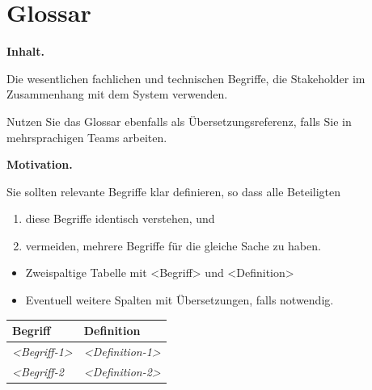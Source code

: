 \documentclass[]{article}
\begin{document}
\section{Glossar}\label{section-glossary}

\textbf{Inhalt.}

Die wesentlichen fachlichen und technischen Begriffe, die Stakeholder im
Zusammenhang mit dem System verwenden.

Nutzen Sie das Glossar ebenfalls als Übersetzungsreferenz, falls Sie in
mehrsprachigen Teams arbeiten.

\textbf{Motivation.}

Sie sollten relevante Begriffe klar definieren, so dass alle Beteiligten

\begin{enumerate}
\def\labelenumi{\arabic{enumi}.}
\item
  diese Begriffe identisch verstehen, und
\item
  vermeiden, mehrere Begriffe für die gleiche Sache zu haben.
\end{enumerate}

\begin{itemize}
\item
  Zweispaltige Tabelle mit \textless{}Begriff\textgreater{} und
  \textless{}Definition\textgreater{}
\item
  Eventuell weitere Spalten mit Übersetzungen, falls notwendig.
\end{itemize}

\begin{longtable}[]{@{}ll@{}}
\toprule
\begin{minipage}[b]{0.31\columnwidth}\raggedright\strut
Begriff\strut
\end{minipage} & \begin{minipage}[b]{0.63\columnwidth}\raggedright\strut
Definition\strut
\end{minipage}\tabularnewline
\midrule
\endhead
\begin{minipage}[t]{0.31\columnwidth}\raggedright\strut
\emph{\textless{}Begriff-1\textgreater{}}\strut
\end{minipage} & \begin{minipage}[t]{0.63\columnwidth}\raggedright\strut
\emph{\textless{}Definition-1\textgreater{}}\strut
\end{minipage}\tabularnewline
\begin{minipage}[t]{0.31\columnwidth}\raggedright\strut
\emph{\textless{}Begriff-2}\strut
\end{minipage} & \begin{minipage}[t]{0.63\columnwidth}\raggedright\strut
\emph{\textless{}Definition-2\textgreater{}}\strut
\end{minipage}\tabularnewline
\bottomrule
\end{longtable}
\end{document}
